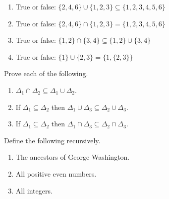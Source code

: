 
\begin{enumerate}
	\item True or false: $\{2,4,6\}\cup\{1,2,3\}\subseteq\{1,2,3,4,5,6\}$
	\item True or false: $\{2,4,6\}\cap\{1,2,3\}=\{1,2,3,4,5,6\}$
    \item True or false: $\{1,2\}\cap\{3,4\}\subseteq\{1,2\}\cup\{3,4\}$
	\item True or false: $\{1\}\cup\{2, 3\}=\{1, \{2, 3\}\}$
\end{enumerate}

Prove each of the following.
\begin{enumerate}
	\item $\Delta_1\cap\Delta_2\subseteq\Delta_1\cup\Delta_2$.
	\item If $\Delta_1\subseteq\Delta_2$ then $\Delta_1\cup\Delta_3\subseteq\Delta_2\cup\Delta_3$.
    \item If $\Delta_1\subseteq\Delta_2$ then $\Delta_1\cap\Delta_3\subseteq\Delta_2\cap\Delta_3$.
\end{enumerate}

Define the following recursively.
\begin{enumerate}
	\item The ancestors of George Washington.
    \item All positive even numbers.
	\item All integers.
\end{enumerate}


